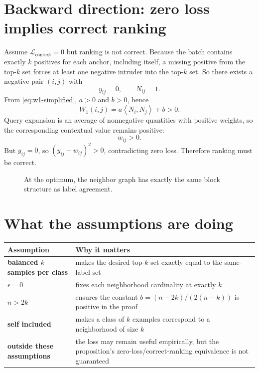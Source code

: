 \documentclass[11pt,oneside,openany]{book}
\theoremstyle{myplain}
\theoremstyle{definition}
\newcommand{\inner}[2]{\left\langle #1,#2\right\rangle}
\begin{document}
\section{Backward direction: zero loss implies correct ranking}

Assume $\mathcal L_{\mathrm{context}}=0$ but ranking is not correct. Because the batch contains exactly $k$ positives for each anchor, including itself, a missing positive from the top-$k$ set forces at least one negative intruder into the top-$k$ set. So there exists a negative pair $(i,j)$ with
\[
  y_{ij}=0,\qquad N_{ij}=1.
\]
From \cref{eq:w1-simplified}, $a>0$ and $b>0$, hence
\[
  W_1(i,j)=a\inner{N_i}{N_j}+b>0.
\]
Query expansion is an average of nonnegative quantities with positive weights, so the corresponding contextual value remains positive:
\[
  w_{ij}>0.
\]
But $y_{ij}=0$, so $(y_{ij}-w_{ij})^2>0$, contradicting zero loss. Therefore ranking must be correct.

\begin{figure}[H]
\centering
{}
\caption{At the optimum, the neighbor graph has exactly the same block structure as label agreement.}
\label{fig:proof-matrix}
\end{figure}

\section{What the assumptions are doing}

\begin{center}
\small
\begin{tabularx}{\textwidth}{>{\bfseries}p{} X}
\toprule
Assumption & Why it matters \\
\midrule
balanced $k$ samples per class & makes the desired top-$k$ set exactly equal to the same-label set \\
$\epsilon=0$ & fixes each neighborhood cardinality at exactly $k$ \\
$n>2k$ & ensures the constant $b=(n-2k)/(2(n-k))$ is positive in the proof \\
self included & makes a class of $k$ examples correspond to a neighborhood of size $k$ \\
outside these assumptions & the loss may remain useful empirically, but the proposition's zero-loss/correct-ranking equivalence is not guaranteed \\
\bottomrule
\end{tabularx}
\end{center}
\end{document}
